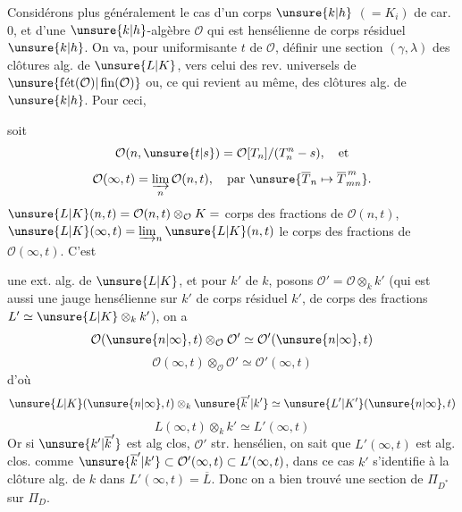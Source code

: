 


Considérons plus généralement le cas d'un corps $\unsure{k|h}$ $(=K_i)$ de car. $0$, et d'une  $\unsure{k|h}$-algèbre $\mathcal{O}$ qui est  hensélienne de corps résiduel $\unsure{k|h}$.
On va, pour  uniformisante $t$ de $\mathcal{O}$, définir une section $(\gamma,\lambda)$    des clôtures alg. de $\unsure{L|K}$, vers celui des rev. universels de $\unsure{\operatorname{f\acute{e}t}(\mathcal{O})|\operatorname{fin}(\mathcal{O})}$ ou, ce qui revient au même, des clôtures alg. de $\unsure{k|h}$. Pour ceci,

soit
\[
\mathcal{O}(n,\unsure{t|s})=\mathcal{O}[T_n]/(T_n^n-s),\quad\text{et}
\]
\[
\mathcal{O}(\infty,t)=\varinjlim_n\mathcal{O}(n,t),\quad
\text{par }\unsure{\overline{T}_n\mapsto\overline{T}_{mn}^{\,m}}.
\]
$\unsure{L|K}(n,t)=\mathcal{O}(n,t)\otimes_{\mathcal{O}}K=$ corps des fractions de $\mathcal{O}(n,t)$, $\unsure{L|K}(\infty,t)=\varinjlim_n\unsure{L|K}(n,t)$ le corps des fractions de $\mathcal{O}(\infty,t)$. C'est



une ext. alg. de $\unsure{L|K}$, et pour    $k'$ de $k$, posons $\mathcal{O}'=\mathcal{O}\otimes_k k'$ (qui est aussi une jauge hensélienne sur $k'$ de corps résiduel $k'$, de corps des fractions $L'\simeq\unsure{L|K}\otimes_k k'$), on a  
\[
\mathcal{O}(\unsure{n|\infty},t)\otimes_{\mathcal{O}}\mathcal{O}'\simeq\mathcal{O}'(\unsure{n|\infty},t)
\]
\[
\mathcal{O}(\infty,t)\otimes_{\mathcal{O}}\mathcal{O}'\simeq\mathcal{O}'(\infty,t)
\]
d'où
\[
\unsure{L|K}(\unsure{n|\infty},t)\otimes_k\unsure{\overline{k}'|k'}\simeq\unsure{L'|K'}(\unsure{n|\infty},t)
\]
\[
L(\infty,t)\otimes_k k'\simeq L'(\infty,t)
\]
Or si $\unsure{k'|\overline{k}'}$ est alg clos,  $\mathcal{O}'$ str. hensélien, on sait que $L'(\infty,t)$ est  alg. clos.
 comme $\unsure{\overline{k}'|k'}\subset\mathcal{O}'(\infty,t)\subset L'(\infty,t)$, dans ce cas $k'$  s'identifie à la clôture alg.  de $k$ dans $L'(\infty,t)=\overline{L}$.
Donc on a bien trouvé une section de $\Pi_{D^*}$ sur $\Pi_D$.

